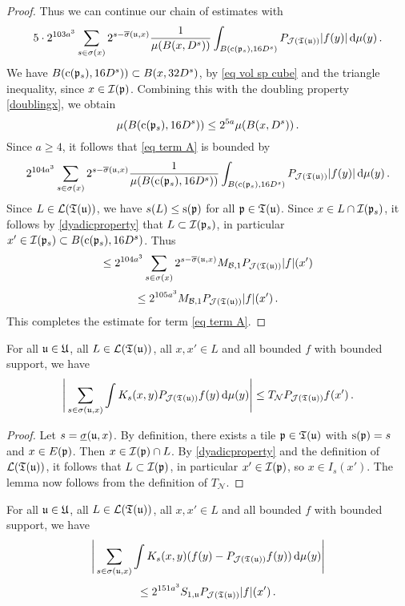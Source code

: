 {\begin{proof}
    Thus we can continue our chain of estimates with
    $$
        5\cdot 2^{103a^3} \sum_{s\in\sigma(x)}2^{s - \overline{\sigma}(\mathfrak u, x)} \frac{1}{\mu(B(x,D^s))}\int_{B(\mathrm{c}(\mathfrak p_s),16 D^s)}P_{\mathcal{J}(\mathfrak T(\mathfrak u))}|f(y)|\,\mathrm{d}\mu(y)\,.
    $$
    We have $B(\mathrm{c}(\mathfrak p_s), 16D^s)) \subset B(x, 32D^s)$, by \eqref{eq vol sp cube} and the triangle inequality, since $x \in \mathcal{I}(\mathfrak p)$. Combining this with the doubling property \eqref{doublingx}, we obtain
    $$
        \mu(B(\mathrm{c}(\mathfrak p_s), 16D^s)) \le 2^{5a} \mu(B(x, D^s))\,.
    $$
    Since $a \ge 4$, it follows that \eqref{eq term A} is bounded by
    $$
        2^{104a^3} \sum_{s\in\sigma(x)}2^{s - \overline{\sigma}(\mathfrak u, x)} \frac{1}{\mu(B(\mathrm{c}(\mathfrak p_s),16D^s))}\int_{B(\mathrm{c}(\mathfrak p_s),16D^s)}P_{\mathcal{J}(\mathfrak T(\mathfrak u))}|f(y)|\,\mathrm{d}\mu(y)\,.
    $$
    Since $L \in \mathcal{L}(\mathfrak T(\mathfrak u))$, we have $s(L) \le \mathrm{s}(\mathfrak p)$ for all $\mathfrak p \in \mathfrak T(\mathfrak u)$. Since $x\in L \cap \mathcal{I}(\mathfrak p_s)$, it follows by \eqref{dyadicproperty} that $L \subset \mathcal{I}(\mathfrak p_s)$, in particular $x' \in \mathcal{I}(\mathfrak p_s) \subset B(\mathrm{c}(\mathfrak p_s), 16D^s)$. Thus
    $$
        \le 2^{104a^3} \sum_{s\in\sigma(x)}2^{s - \overline{\sigma}(\mathfrak u, x)} M_{\mathcal{B}, 1}P_{\mathcal{J}(\mathfrak T(\mathfrak u))}|f|(x')
    $$
    $$
        \le 2^{105a^3} M_{\mathcal{B}, 1}P_{\mathcal{J}(\mathfrak T(\mathfrak u))}|f|(x')\,.
    $$
    This completes the estimate for term \eqref{eq term A}.
\end{proof}

\begin{lemma}
    \label{lem term B}
    For all $\mathfrak u \in \mathfrak U$, all $L \in \mathcal{L}(\mathfrak T(\mathfrak u))$, all $x, x' \in L$ and all bounded $f$ with bounded support, we have
    $$
         \Bigg| \sum_{s \in \sigma(\mathfrak u, x)} \int K_s(x,y) P_{\mathcal{J}(\mathfrak T(\mathfrak u))} f(y) \, \mathrm{d}\mu(y) \Bigg| \le T_{\mathcal{N}} P_{\mathcal{J}(\mathfrak T(\mathfrak u))} f(x')\,.
    $$
\end{lemma}

\begin{proof}
    Let $s = \underline{\sigma}(\mathfrak u, x)$. By definition, there exists a tile $\mathfrak p \in \mathfrak T(\mathfrak u)$ with $\mathrm{s}(\mathfrak p) = s$ and $x \in E(\mathfrak p)$. Then $x \in \mathcal{I}(\mathfrak p) \cap L$. By \eqref{dyadicproperty} and the definition of $\mathcal{L}(\mathfrak T(\mathfrak u))$, it follows that $L \subset \mathcal{I}(\mathfrak p)$, in particular $x' \in \mathcal{I}(\mathfrak p)$, so $x \in I_s(x')$.
    The lemma now follows from the definition of $T_{\mathcal{N}}$.
\end{proof}

\begin{lemma}
    \label{lem term C}
    For all $\mathfrak u \in \mathfrak U$, all $L \in \mathcal{L}(\mathfrak T(\mathfrak u))$, all $x, x' \in L$ and all bounded $f$ with bounded support, we have
    \begin{equation*}
        \Bigg| \sum_{s \in \sigma(\mathfrak u, x)} \int K_s(x,y) (f(y) - P_{\mathcal{J}(\mathfrak T(\mathfrak u))} f(y)) \, \mathrm{d}\mu(y) \Bigg|
    \end{equation*}
    \begin{equation*}
          \le 2^{151a^3} S_{1,\mathfrak u} P_{\mathcal{J}(\mathfrak T(\mathfrak u))}|f|(x')\,.
    \end{equation*}
\end{lemma}

}
